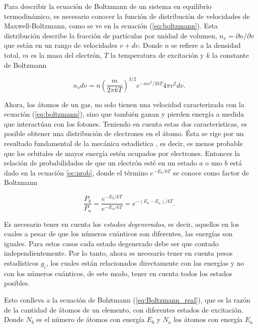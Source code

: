 \documentclass[12pt,oneside,openany,letter]{book}
\begin{document}
\noindent Para describir la ecuación de Boltzmann de un sistema en equilibrio termodinámico, es necesario conocer la función de distribución de velocidades de Maxwell-Boltzmann, como se ve en la ecuación (\ref{eq:boltzmann}). Esta distribución describe la fracción de partículas por unidad de volumen, $n_v = \partial n / \partial v$ que están en un rango de velocidades $v + dv$. Donde $n$ se refiere a la densidad total, $m$ es la masa del electrón, $T$ la temperatura de excitación y $k$ la constante de Boltzmann

\begin{equation}
n_{v} d v=n\left(\frac{m}{2 \pi k T}\right)^{3 / 2} e^{-m v^{2} / 2 k T} 4 \pi v^{2} d v.
\label{eq:boltzmann}
\end{equation}

\noindent Ahora, los átomos de un gas, no solo tienen una velocidad caracterizada con la ecuación (\ref{eq:boltzmann}), sino  que también ganan y pierden energía a medida que interactúan con los fotones. Teniendo en cuenta estas dos características, es posible obtener una distribución de electrones en el átomo. Ésta se rige por un resultado fundamental de la mecánica estadística \citep{carroll2017introduction}, es decir, es menos probable que los orbitales de mayor energía estén ocupados por electrones. Entonces la relación de probabilidades de que un electrón esté en un estado $a$ o uno $b$ está dado en la ecuación \ref{ec:prob}, donde el término $e^{-E_{b} / k T}$ se conoce como factor de Boltzmann

\begin{equation}
\frac{P_b}{P_a}=\frac{e^{-E_{b} / k T}}{e^{-E_{a} / k T}}=e^{-\left(E_{b}-E_{a}\right) / k T}.
\label{ec:prob}
\end{equation}

\noindent Es necesario tener en cuenta los \textit{estados degenerados}, es decir, aquellos  en los cuales a pesar de que los números cuánticos son diferentes, las energías son iguales. Para estos casos cada estado degenerado debe ser que contado independientemente. Por lo tanto, ahora es necesario tener en cuenta pesos estadísticos $g_i$, los cuales están relacionados directamente con las energías y no con los números cuánticos, de este modo, tener en cuenta todos los estados posibles.

\noindent Esto conlleva a la ecuación de Bolztmann (\ref{eq:Boltzmann_real}), que es la razón de la cantidad de átomos de un elemento, con diferentes estados de excitación. Donde $N_b$ es el número de átomos con energía $E_b$ y $N_a$ los átomos con energía $E_a$
\end{document}
